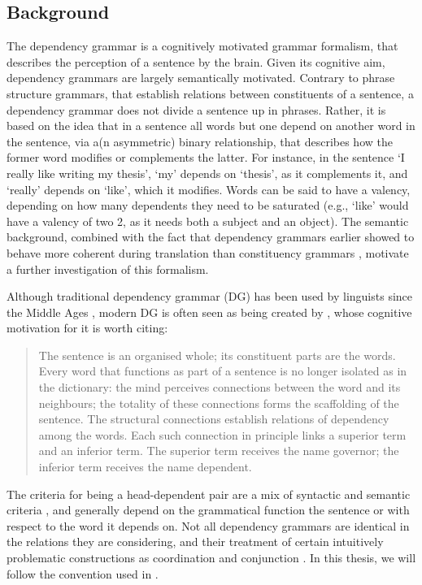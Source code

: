 \subsection{Background}

The dependency grammar is a cognitively motivated grammar formalism, that describes the perception of a sentence by the brain. Given its cognitive aim, dependency grammars are largely semantically motivated. Contrary to phrase structure grammars, that establish relations between constituents of a sentence, a dependency grammar does not divide a sentence up in phrases. Rather, it is based on the idea that in a sentence all words but one depend on another word in the sentence, via a(n asymmetric) binary relationship, that describes how the former word modifies or complements the latter. For instance, in the sentence `I really like writing my thesis', `my' depends on `thesis', as it complements it, and `really' depends on `like', which it modifies. Words can be said to have a valency, depending on how many dependents they need to be saturated (e.g., `like' would have a valency of two 2, as it needs both a subject and an object). The semantic background, combined with the fact that dependency grammars earlier showed to behave more coherent during translation than constituency grammars \citep{fox2002phrasal}, motivate a further investigation of this formalism. 

Although traditional dependency grammar (DG) has been used by linguists since the Middle Ages \citep{covington1990dependency}, modern DG is often seen as being created by \cite{tesniere1959elements}, whose cognitive motivation for it is worth citing:

\begin{quote}
The sentence is an organised whole; its constituent parts are the words. Every word that functions as part of a sentence is no longer isolated as in the dictionary: the mind perceives connections between the word and its neighbours; the totality of these connections forms the scaffolding of the sentence. The structural connections establish relations of dependency among the words. Each such connection in principle links a superior term and an inferior term. The superior term receives the name governor; the inferior term receives the name dependent. \citep[Translation:][]{ryan2013}
\end{quote}

The criteria for being a head-dependent pair are a mix of syntactic and semantic criteria \citep{nivre2005dependency}, and generally depend on the grammatical function the sentence or with respect to the word it depends on. Not all dependency grammars are identical in the relations they are considering, and their treatment of certain intuitively problematic constructions as coordination and conjunction \citep{nivre2005dependency}. In this thesis, we will follow the convention used in \cite{de2006generating}.

